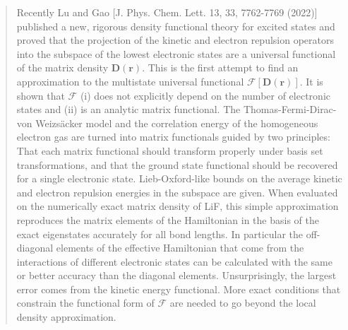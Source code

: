 \documentclass[journal=jpclcd,manuscript=letter]{achemso}
\newcommand\m[1]{\mathbf{#1}}
\renewcommand\vec[1]{\mathbf{#1}}
\begin{document}
\begin{abstract}
Recently Lu and Gao [J. Phys. Chem. Lett. 13, 33, 7762-7769 (2022)]
published a new, rigorous density functional theory for excited states and proved that the
projection of the kinetic and electron repulsion operators into the subspace of the lowest electronic states
are a universal functional of the matrix density $\m{D}(\vec{r})$.
This is the first attempt to find an approximation to the multistate universal functional $\mathcal{F}[\m{D}(\vec{r})]$.
It is shown that $\mathcal{F}$ (i) does not explicitly depend on the number of electronic states and (ii)
is an analytic matrix functional. 
The Thomas-Fermi-Dirac-von Weizs\"{a}cker model and the correlation energy of the homogeneous electron gas
are turned into matrix functionals guided by two principles: That each matrix functional should transform
properly under basis set transformations, and that the ground state functional should be recovered for a single electronic state.
Lieb-Oxford-like bounds on the average kinetic and electron repulsion energies in the subspace are given.
When evaluated on the numerically exact matrix density of LiF, this simple approximation
reproduces the matrix elements of the Hamiltonian in the basis of the exact eigenstates accurately for all bond lengths.
In particular the off-diagonal elements of the effective Hamiltonian that come from the
interactions of different electronic states can be calculated with the same or better accuracy than the diagonal elements.
Unsurprisingly, the largest error comes from the kinetic energy functional.
More exact conditions that constrain the functional form of $\mathcal{F}$ are needed to go beyond the local density approximation.

%


\end{abstract}
\end{document}
